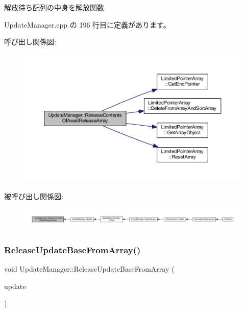 解放待ち配列の中身を解放関数 



 Update\+Manager.\+cpp の 196 行目に定義があります。

呼び出し関係図\+:
\nopagebreak
\begin{figure}[H]
\begin{center}
\leavevmode
\includegraphics[width=350pt]{class_update_manager_ac87db8037fbfb800187c50ca22a1f01d_cgraph}
\end{center}
\end{figure}
被呼び出し関係図\+:
\nopagebreak
\begin{figure}[H]
\begin{center}
\leavevmode
\includegraphics[width=350pt]{class_update_manager_ac87db8037fbfb800187c50ca22a1f01d_icgraph}
\end{center}
\end{figure}
\mbox{\label{class_update_manager_a8a54226896f4280b589af85c07e869d9}} 
\subsubsection{\texorpdfstring{Release\+Update\+Base\+From\+Array()}{ReleaseUpdateBaseFromArray()}}
{\footnotesize\ttfamily void Update\+Manager\+::\+Release\+Update\+Base\+From\+Array (\begin{DoxyParamCaption}\item[{\mbox{\hyperlink{class_update_base}{Update\+Base}} $\ast$}]{update }\end{DoxyParamCaption})}



